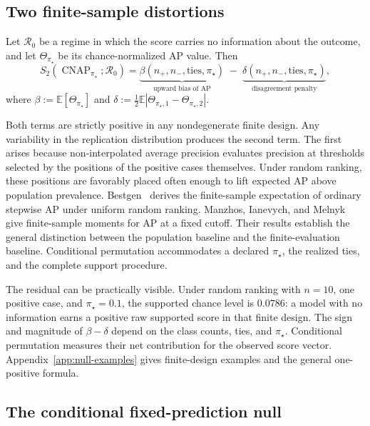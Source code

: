 \documentclass[11pt]{article}
\newcommand{\AP}{\operatorname{AP}}
\newcommand{\CNAP}{\operatorname{CNAP}}
\newcommand{\Regime}{\mathcal{R}}
\newcommand{\E}{\mathbb{E}}
\theoremstyle{remark}
\begin{document}
\subsection{Two finite-sample distortions}

Let $\Regime_0$ be a regime in which the score carries no information about the outcome, and let $\Theta_{\pi_\star}$ be its chance-normalized AP value. Then
\begin{equation}
S_2(\CNAP_{\pi_\star};\Regime_0)
=
\underbrace{\beta(n_+,n_-,\text{ties},\pi_\star)}_{\text{upward bias of }\AP}
\;-\;
\underbrace{\delta(n_+,n_-,\text{ties},\pi_\star)}_{\text{disagreement penalty}} ,
\label{eq:two-distortions}
\end{equation}
where $\beta:=\E[\Theta_{\pi_\star}]$ and $\delta:=\tfrac12\E|\Theta_{\pi_\star,1}-\Theta_{\pi_\star,2}|$.

Both terms are strictly positive in any nondegenerate finite design. Any variability in the replication distribution produces the second term. The first arises because non-interpolated average precision evaluates precision at thresholds selected by the positions of the positive cases themselves. Under random ranking, these positions are favorably placed often enough to lift expected AP above population prevalence. Bestgen~\cite{bestgen2015random} derives the finite-sample expectation of ordinary stepwise AP under uniform random ranking. Manzhos, Ianevych, and Melnyk~\cite{manzhos2026average} give finite-sample moments for AP at a fixed cutoff. Their results establish the general distinction between the population baseline and the finite-evaluation baseline. Conditional permutation accommodates a declared $\pi_\star$, the realized ties, and the complete support procedure.

The residual can be practically visible. Under random ranking with $n=10$, one positive case, and $\pi_\star=0.1$, the supported chance level is $0.0786$: a model with no information earns a positive raw supported score in that finite design. The sign and magnitude of $\beta-\delta$ depend on the class counts, ties, and $\pi_\star$. Conditional permutation measures their net contribution for the observed score vector. Appendix~\ref{app:null-examples} gives finite-design examples and the general one-positive formula.

\subsection{The conditional fixed-prediction null}
\label{sec:conditional-null}
\end{document}
